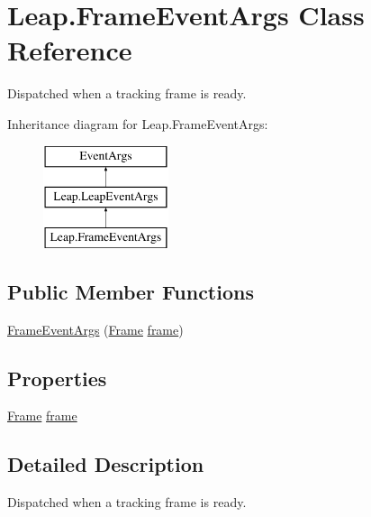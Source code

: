 \hypertarget{class_leap_1_1_frame_event_args}{}\section{Leap.\+Frame\+Event\+Args Class Reference}
\label{class_leap_1_1_frame_event_args}


Dispatched when a tracking frame is ready.  


Inheritance diagram for Leap.\+Frame\+Event\+Args\+:\begin{figure}[H]
\begin{center}
\leavevmode
\includegraphics[height=3.000000cm]{class_leap_1_1_frame_event_args}
\end{center}
\end{figure}
\subsection*{Public Member Functions}
\begin{DoxyCompactItemize}
\item 
\mbox{\hyperlink{class_leap_1_1_frame_event_args_a53a90b533be3c20eaa86db4dacb61ddd}{Frame\+Event\+Args}} (\mbox{\hyperlink{class_leap_1_1_frame}{Frame}} \mbox{\hyperlink{class_leap_1_1_frame_event_args_a5309519057d70f09b7ba3b9aff9510c6}{frame}})
\end{DoxyCompactItemize}
\subsection*{Properties}
\begin{DoxyCompactItemize}
\item 
\mbox{\hyperlink{class_leap_1_1_frame}{Frame}} \mbox{\hyperlink{class_leap_1_1_frame_event_args_a5309519057d70f09b7ba3b9aff9510c6}{frame}}
\end{DoxyCompactItemize}


\subsection{Detailed Description}
Dispatched when a tracking frame is ready. 

